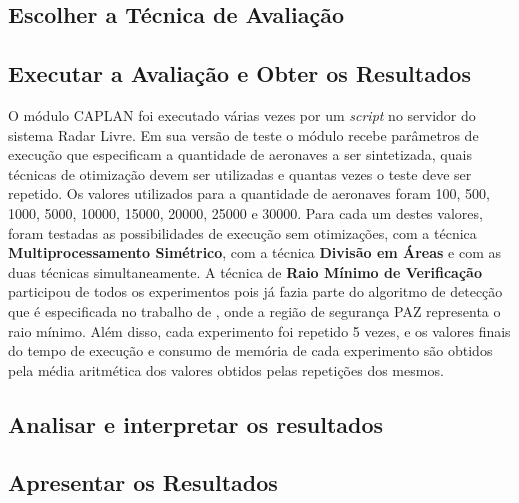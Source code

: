 \subsection{Escolher a Técnica de Avaliação}


\subsection{Executar a Avaliação e Obter os Resultados}

O módulo CAPLAN foi executado várias vezes por um \textit{script} no servidor do sistema Radar Livre. Em sua versão de teste o módulo recebe parâmetros de execução que especificam a quantidade de aeronaves a ser sintetizada, quais técnicas de otimização devem ser utilizadas e quantas vezes o teste deve ser repetido. Os valores utilizados para a quantidade de aeronaves foram 100, 500, 1000, 5000, 10000, 15000, 20000, 25000 e 30000. Para cada um destes valores, foram testadas as possibilidades de execução sem otimizações, com a técnica \textbf{Multiprocessamento Simétrico}, com a técnica \textbf{Divisão em Áreas} e com as duas técnicas simultaneamente. A técnica de \textbf{Raio Mínimo de Verificação} participou de todos os experimentos pois já fazia parte do algoritmo de detecção que é especificada no trabalho de , onde a região de segurança PAZ representa o raio mínimo. Além disso, cada experimento foi repetido 5 vezes, e os valores finais do tempo de execução e consumo de memória de cada experimento são obtidos pela média aritmética dos valores obtidos pelas repetições dos mesmos.

\subsection{Analisar e interpretar os resultados}
\subsection{Apresentar os Resultados}
